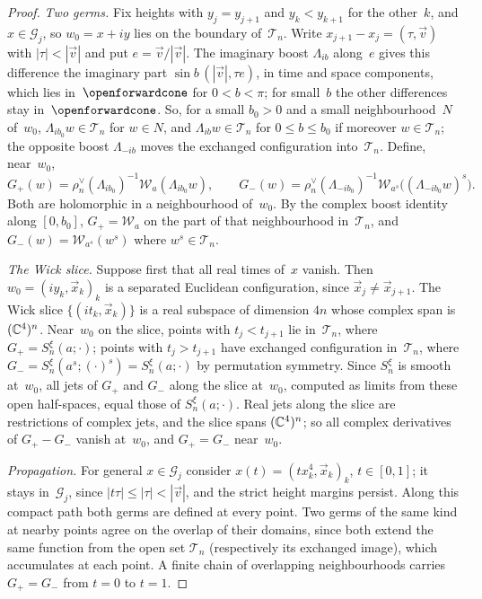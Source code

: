 \begin{proof}
\emph{Two germs.} Fix heights with $y_j=y_{j+1}$ and $y_k<y_{k+1}$ for the other~$k$, and $x\in\mathcal G_j$, so $w_0=x+iy$ lies on the boundary of~$\mathcal T_n$. Write $x_{j+1}-x_j=(\tau,\vec v)$ with $|\tau|<|\vec v|$ and put $e=\vec v/|\vec v|$. The imaginary boost $\Lambda_{ib}$ along~$e$ gives this difference the imaginary part $\sin b\,(|\vec v|,\tau e)$, in time and space components, which lies in~$\openforwardcone$ for $0<b<\pi$; for small~$b$ the other differences stay in~$\openforwardcone$. So, for a small $b_0>0$ and a small neighbourhood~$N$ of~$w_0$, $\Lambda_{ib_0}w\in\mathcal T_n$ for $w\in N$, and $\Lambda_{ib}w\in\mathcal T_n$ for $0\le b\le b_0$ if moreover $w\in\mathcal T_n$; the opposite boost $\Lambda_{-ib}$ moves the exchanged configuration into~$\mathcal T_n$. Define, near~$w_0$,
\begin{equation*}
G_+(w)=\rho_n^\vee(\Lambda_{ib_0})^{-1}\mathcal W_a(\Lambda_{ib_0}w),\qquad
G_-(w)=\rho_n^\vee(\Lambda_{-ib_0})^{-1}\mathcal W_{a^s}\bigl((\Lambda_{-ib_0}w)^s\bigr).
\end{equation*}
Both are holomorphic in a neighbourhood of~$w_0$. By the complex boost identity along $[0,b_0]$, $G_+=\mathcal W_a$ on the part of that neighbourhood in~$\mathcal T_n$, and $G_-(w)=\mathcal W_{a^s}(w^s)$ where $w^s\in\mathcal T_n$.

\emph{The Wick slice.} Suppose first that all real times of~$x$ vanish. Then $w_0=(iy_k,\vec x_k)_k$ is a separated Euclidean configuration, since $\vec x_j\ne\vec x_{j+1}$. The Wick slice $\{(it_k,\vec x_k)\}$ is a real subspace of dimension $4n$ whose complex span is $(\mathbb{C}^4)^n$. Near~$w_0$ on the slice, points with $t_j<t_{j+1}$ lie in~$\mathcal T_n$, where $G_+=S^\xi_n(a;\cdot)$; points with $t_j>t_{j+1}$ have exchanged configuration in~$\mathcal T_n$, where $G_-=S^\xi_n(a^s;(\cdot)^s)=S^\xi_n(a;\cdot)$ by permutation symmetry. Since $S^\xi_n$ is smooth at~$w_0$, all jets of $G_+$ and $G_-$ along the slice at~$w_0$, computed as limits from these open half-spaces, equal those of $S^\xi_n(a;\cdot)$. Real jets along the slice are restrictions of complex jets, and the slice spans $(\mathbb{C}^4)^n$; so all complex derivatives of $G_+-G_-$ vanish at~$w_0$, and $G_+=G_-$ near~$w_0$.

\emph{Propagation.} For general $x\in\mathcal G_j$ consider $x(t)=(tx_k^4,\vec x_k)_k$, $t\in[0,1]$; it stays in~$\mathcal G_j$, since $|t\tau|\le|\tau|<|\vec v|$, and the strict height margins persist. Along this compact path both germs are defined at every point. Two germs of the same kind at nearby points agree on the overlap of their domains, since both extend the same function from the open set $\mathcal T_n$ (respectively its exchanged image), which accumulates at each point. A finite chain of overlapping neighbourhoods carries $G_+=G_-$ from $t=0$ to $t=1$.


\end{proof}
